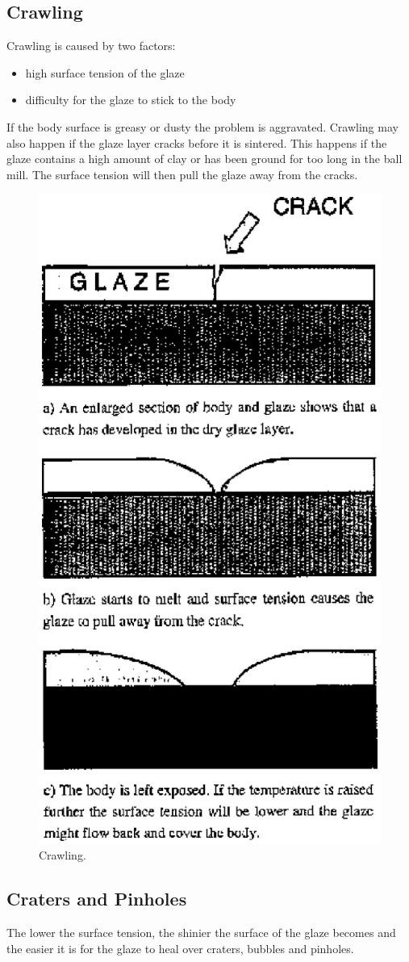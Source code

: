 \subsection{Crawling}
Crawling is caused by two factors:
\begin{itemize}
\item high surface tension of the glaze
\item difficulty for the glaze to stick to the body
\end{itemize}
If the body surface is greasy or dusty the problem is aggravated. Crawling may 
also happen if the glaze layer cracks before it is sintered. This happens if 
the glaze contains a high amount of clay or has been ground for too long in the 
ball mill. The surface tension will then pull the glaze away from the cracks.
\begin{figure}[htbp!]
  \centering
  \includegraphics[width=0.5\linewidth]{img/crawling.eps}
  \caption{Crawling.}
  \label{fig:crawling}
\end{figure}
\subsection{Craters and Pinholes}
The lower the surface tension, the shinier the surface of the glaze becomes and 
the easier it is for the glaze to heal over craters, bubbles and pinholes.

